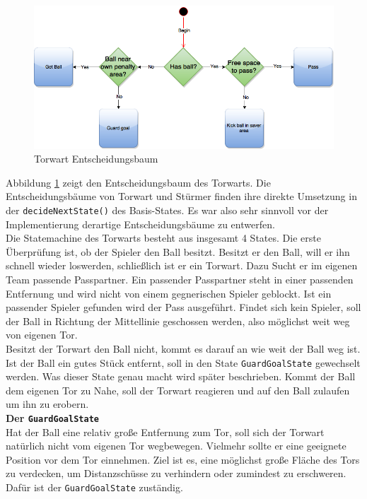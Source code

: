 \documentclass[fontsize=12pt,a4paper,final]{scrartcl}[2003/01/01]
\makeatletter
\def\ScaleIfNeeded{%
	\ifdim\Gin@nat@width>\linewidth
		\linewidth
	\else
		\Gin@nat@width
	\fi
}
\makeatother
\begin{document}
\begin{figure}[H]
	\centering
	\includegraphics[width=\ScaleIfNeeded]{Grafiken/KI/Keeper}
	\caption{Torwart Entscheidungsbaum}
	\label{Torwart Entscheidungsbaum}
\end{figure}

Abbildung \ref{Torwart Entscheidungsbaum} zeigt den Entscheidungsbaum des Torwarts. Die Entscheidungsbäume von Torwart und Stürmer finden ihre direkte Umsetzung in der \lstinline$decideNextState()$ des Basis-States. Es war also sehr sinnvoll vor der Implementierung derartige Entscheidungsbäume zu entwerfen.
\\

Die Statemachine des Torwarts besteht aus insgesamt 4 States. Die erste Überprüfung ist, ob der Spieler den Ball besitzt. Besitzt er den Ball, will er ihn schnell wieder loswerden, schließlich ist er ein Torwart. Dazu Sucht er im eigenen Team passende Passpartner. Ein passender Passpartner steht in einer passenden Entfernung und wird nicht von einem gegnerischen Spieler geblockt. Ist ein passender Spieler gefunden wird der Pass ausgeführt. Findet sich kein Spieler, soll der Ball in Richtung der Mittellinie geschossen werden, also möglichst weit weg von eigenen Tor.
\\

Besitzt der Torwart den Ball nicht, kommt es darauf an wie weit der Ball weg ist. Ist der Ball ein gutes Stück entfernt, soll in den State \lstinline$GuardGoalState$ gewechselt werden. Was dieser State genau macht wird später beschrieben. Kommt der Ball dem eigenen Tor zu Nahe, soll der Torwart reagieren und auf den Ball zulaufen um ihn zu erobern.
\\

\textbf{Der \lstinline$GuardGoalState$}
\\

Hat der Ball eine relativ große Entfernung zum Tor, soll sich der Torwart natürlich nicht vom eigenen Tor wegbewegen. Vielmehr sollte er eine geeignete Position vor dem Tor einnehmen. Ziel ist es, eine möglichst große Fläche des Tors zu \glqq verdecken\grqq, um Distanzschüsse zu verhindern oder zumindest zu erschweren. Dafür ist der \lstinline$GuardGoalState$ zuständig.
\\
\end{document}
